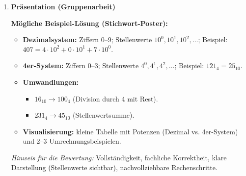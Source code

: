 \documentclass[11pt,a4paper]{scrartcl}
\newenvironment{loesungen}{%
	\begin{enumerate}[leftmargin=*,label=\textbf{Lösung~\arabic*:}]
	}{\end{enumerate}}
\newenvironment{schritte}{%
	\begin{enumerate}[leftmargin=*,label=\alph*)]
	}{\end{enumerate}}
\begin{document}
\begin{loesungen}
\begin{schritte}
			\medskip
			
			\textit{Weiteres Beispiel: } \(45_{10}\) in Basis 4
			\[
			45:4=11 \text{ R }1,\quad 11:4=2 \text{ R }3,\quad 2:4=0 \text{ R }2
			\quad\Rightarrow\quad 45_{10}=231_4.
			\]
			
			\medskip
			
			\textit{(ii) Basis 4 \(\to\) Dezimal (Stellenwertsumme):}
			
			\[
			121_4 \;=\; 1\cdot 4^2 \;+\; 2\cdot 4^1 \;+\; 1\cdot 4^0
			\;=\; 1\cdot 16 + 2\cdot 4 + 1\cdot 1 \;=\; 16+8+1 \;=\; 25_{10}.
			\]
			
			\textit{Weiteres Beispiel: } \(3201_4 = 3\cdot 64 + 2\cdot 16 + 0\cdot 4 + 1\cdot 1 = 192+32+0+1 = 225_{10}.\)
			
		\end{schritte}
		
		\textbf{Zusammenfassung:} In Basis 4 gibt es vier Ziffern (0–3). Die Wertigkeit einer Stelle wächst mit den Potenzen von 4. Zahlenumwandlungen erfolgen entweder über die Division mit Rest (Dezimal \(\to\) Basis 4) oder über die Stellenwertsumme (Basis 4 \(\to\) Dezimal).
		
		\vspace{0.6em}
		
		\item \textbf{Präsentation (Gruppenarbeit)}
		
		\textbf{Mögliche Beispiel-Lösung (Stichwort-Poster):}
		\begin{itemize}[leftmargin=*]
			\item \textbf{Dezimalsystem:} Ziffern 0–9; Stellenwerte \(10^0,10^1,10^2,\dots\); Beispiel: \(407=4\cdot 10^2+0\cdot 10^1+7\cdot 10^0\).
			\item \textbf{4er-System:} Ziffern 0–3; Stellenwerte \(4^0,4^1,4^2,\dots\); Beispiel: \(121_4=25_{10}\).
			\item \textbf{Umwandlungen:}
			\begin{itemize}
				\item \(16_{10}\to 100_4\) (Division durch 4 mit Rest).
				\item \(231_4\to 45_{10}\) (Stellenwertsumme).
			\end{itemize}
			\item \textbf{Visualisierung:} kleine Tabelle mit Potenzen (Dezimal vs. 4er-System) und 2–3 Umrechnungsbeispielen.
		\end{itemize}
		
		\emph{Hinweis für die Bewertung:} Vollständigkeit, fachliche Korrektheit, klare Darstellung (Stellenwerte sichtbar), nachvollziehbare Rechenschritte.
		

\end{loesungen}
\end{document}
